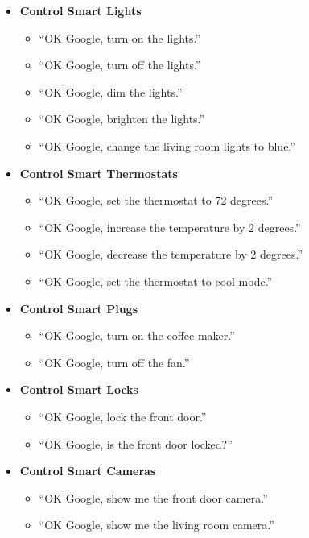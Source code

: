 \documentclass[
  a4paper,
]{article}
\providecommand{\tightlist}{%
  \setlength{\itemsep}{0pt}\setlength{\parskip}{0pt}}\usepackage{longtable,booktabs,array}
\begin{document}
\begin{itemize}
\tightlist
\item
  \textbf{Control Smart Lights}

  \begin{itemize}
  \tightlist
  \item
    ``OK Google, turn on the lights.''
  \item
    ``OK Google, turn off the lights.''
  \item
    ``OK Google, dim the lights.''
  \item
    ``OK Google, brighten the lights.''
  \item
    ``OK Google, change the living room lights to blue.''
  \end{itemize}
\item
  \textbf{Control Smart Thermostats}

  \begin{itemize}
  \tightlist
  \item
    ``OK Google, set the thermostat to 72 degrees.''
  \item
    ``OK Google, increase the temperature by 2 degrees.''
  \item
    ``OK Google, decrease the temperature by 2 degrees.''
  \item
    ``OK Google, set the thermostat to cool mode.''
  \end{itemize}
\item
  \textbf{Control Smart Plugs}

  \begin{itemize}
  \tightlist
  \item
    ``OK Google, turn on the coffee maker.''
  \item
    ``OK Google, turn off the fan.''
  \end{itemize}
\item
  \textbf{Control Smart Locks}

  \begin{itemize}
  \tightlist
  \item
    ``OK Google, lock the front door.''
  \item
    ``OK Google, is the front door locked?''
  \end{itemize}
\item
  \textbf{Control Smart Cameras}

  \begin{itemize}
  \tightlist
  \item
    ``OK Google, show me the front door camera.''
  \item
    ``OK Google, show me the living room camera.''
  \end{itemize}
\end{itemize}
\end{document}
